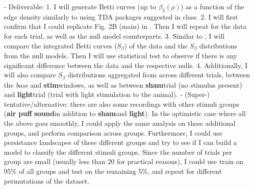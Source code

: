 - Deliverable:
  1. I will generate Betti curves (up to $\beta_3(\rho)$) as a function of the edge density similarly to \cite{Giusti2015-uo} using TDA packages suggested in class.
  2. I will first confirm that I could replicate Fig. 2B (main) in \cite{Giusti2015-uo}. Then I will repeat for the data for each trial, as well as the null model counterparts.
  3. Similar to \cite{Giusti2015-uo}, I will compare the integrated Betti curves ($S_{\beta}$) of the data and the $S_{\beta}$ distributions from the null models. Then I will use statistical test to observe if there is any significant difference between the data and the respective nulls.
  4. Additionally, I will also compare $S_{\beta}$ distributions aggregated from across different trials, between the \textit{base} and \textbf{stim}windows, as well as between \textbf{sham}trial (no stimulus present) and \textbf{light}trial (trial with light stimulation to the animal).
- (Super-) tentative/alternative: there are also some recordings with other stimuli groups (\textbf{air puff} \textbf{sound}in addition to \textbf{sham}and \textbf{light}). In the optimistic case where all the above goes smoothly, I could apply the same analysis on these additional groups, and perform comparison across groups. Furthermore, I could use persistance landscapes of these different groups and try to see if I can build a model to classify the different stimuli groups. Since the number of trials per group are small (usually less than 20 for practical reasons), I could use train on 95\% of all groups and test on the remaining 5\%, and repeat for different permutations of the dataset.
